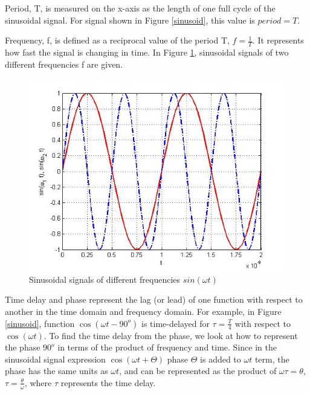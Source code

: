 \documentclass{ximera}
\begin{document}
\begin{definition}
Period, T, is measured on the x-axis as the length of one full cycle of the sinusoidal signal. For signal shown in Figure \ref{sinusoid}, this value is $period=T$. 
\end{definition}

\begin{definition}
Frequency, f,  is defined as a reciprocal value of the period T, $f=\frac{1}{T}$. It represents how fast the signal is changing in time.  In Figure \ref{sinF1F2}, sinusoidal signals of two different frequencies f are given. 

\begin{figure}[htbp]
\includegraphics[scale=0.4]{../jpg/cpef6.jpg}
\caption{Sinusoidal signals of different frequencies $sin ( \omega t)$}
\label{sinF1F2}
\end{figure}

\end{definition}

\begin{definition}
Time delay and phase represent the lag (or lead) of one function with respect to another in the time domain and frequency domain. For example, in Figure \ref{sinusoid}, function $ \cos(\omega t - 90^o)$ is time-delayed for $\tau = \frac{T}{4}$ with respect to $\cos (\omega t)$. To find the time delay from the phase, we look at how to represent the phase $90^o$ in terms of the product of frequency and time. Since in the sinusoidal signal expression $\cos (\omega t + \Theta)$  phase $\Theta$ is added to $\omega t$ term, the phase has the same units as $\omega t$, and can be represented as the product of $\omega \tau = \theta$, $\tau = \frac{\theta}{\omega}$, where $\tau$ represents the time delay.
\end{definition}
\end{document}
